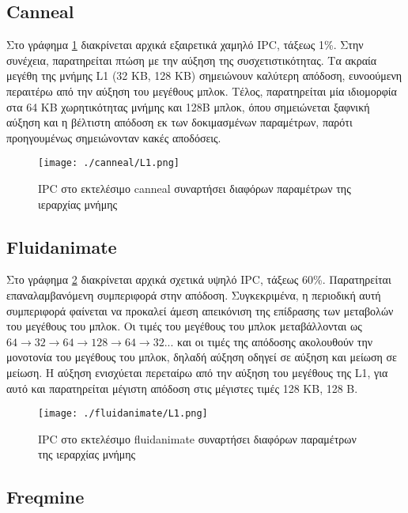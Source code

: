 \documentclass{article}
\newcommand{\eng}[1]{\foreignlanguage{english}{#1}}
\begin{document}
\clearpage
\subsection{\eng{Canneal}}

Στο γράφημα \ref{fig:exp1-canneal} διακρίνεται αρχικά εξαιρετικά χαμηλό \eng{IPC}, τάξεως 1\%.  Στην συνέχεια, παρατηρείται πτώση με την αύξηση της συσχετιστικότητας. Τα ακραία μεγέθη της μνήμης \eng{L1} (32 ΚΒ, 128 ΚΒ) σημειώνουν καλύτερη απόδοση, ευνοούμενη περαιτέρω από την αύξηση του μεγέθους μπλοκ. Τέλος, παρατηρείται μία ιδιομορφία στα 64 ΚΒ χωρητικότητας μνήμης και 128Β μπλοκ, όπου σημειώνεται ξαφνική αύξηση και η βέλτιστη απόδοση εκ των δοκιμασμένων παραμέτρων, παρότι προηγουμένως σημειώνονταν κακές αποδόσεις.

\begin{figure}[h]
    \centering
    \texttt{[image: ./canneal/L1.png]} 
    \caption{\eng{IPC} στο εκτελέσιμο \eng{canneal} συναρτήσει διαφόρων παραμέτρων της ιεραρχίας μνήμης}
    \label{fig:exp1-canneal}
\end{figure}
\FloatBarrier

\clearpage
\subsection{\eng{Fluidanimate}}

Στο γράφημα \ref{fig:exp1-fluidanimate} διακρίνεται αρχικά σχετικά υψηλό \eng{IPC}, τάξεως 60\%. Παρατηρείται επαναλαμβανόμενη συμπεριφορά στην απόδοση. Συγκεκριμένα, η περιοδική αυτή συμπεριφορά φαίνεται να προκαλεί άμεση απεικόνιση της επίδρασης των μεταβολών του μεγέθους του μπλοκ. Οι τιμές του μεγέθους του μπλοκ μεταβάλλονται ως $64 \rightarrow 32 \rightarrow 64 \rightarrow 128 \rightarrow 64 \rightarrow 32 ...$ και οι τιμές της απόδοσης ακολουθούν την μονοτονία του μεγέθους του μπλοκ, δηλαδή αύξηση οδηγεί σε αύξηση και μείωση σε μείωση. Η αύξηση ενισχύεται περεταίρω από την αύξηση του μεγέθους της \eng{L1}, για αυτό και παρατηρείται μέγιστη απόδοση στις μέγιστες τιμές 128 ΚΒ, 128 Β.

\begin{figure}[h]
    \centering
    \texttt{[image: ./fluidanimate/L1.png]} 
    \caption{\eng{IPC} στο εκτελέσιμο \eng{fluidanimate} συναρτήσει διαφόρων παραμέτρων της ιεραρχίας μνήμης}
    \label{fig:exp1-fluidanimate}
\end{figure}
\FloatBarrier

\clearpage
\subsection{\eng{Freqmine}}
\end{document}
